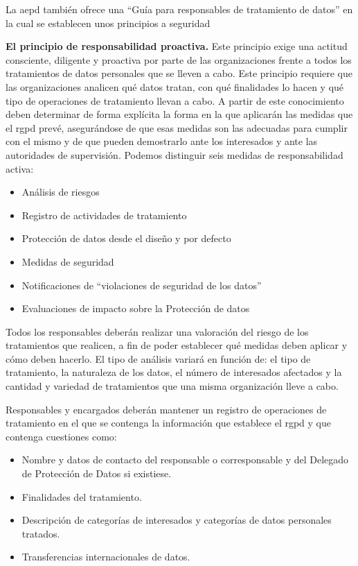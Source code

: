 La \gls{aepd} también ofrece una ``Guía para responsables de tratamiento de datos'' en la cual se establecen unos principios a seguridad

\textbf{El principio de responsabilidad proactiva.} Este principio exige una actitud consciente, diligente y proactiva por parte de las organizaciones frente a todos los tratamientos de datos personales que se lleven a cabo. Este principio requiere que las organizaciones analicen qué datos tratan, con qué finalidades lo hacen y qué tipo de operaciones de tratamiento llevan a cabo. A partir de este conocimiento deben determinar de forma explícita la forma en la que aplicarán las medidas que el \gls{rgpd} prevé, asegurándose de que esas medidas son las adecuadas para cumplir con el mismo y de que pueden demostrarlo ante los interesados y ante las autoridades de supervisión.
Podemos distinguir seis medidas de responsabilidad activa:
\begin{itemize}
    \item Análisis de riesgos
    \item Registro de actividades de tratamiento
    \item Protección de datos desde el diseño y por defecto
    \item Medidas de seguridad
    \item Notificaciones de ``violaciones de seguridad de los datos''
    \item Evaluaciones de impacto sobre la Protección de datos
\end{itemize}

Todos los responsables deberán realizar una valoración del riesgo de los tratamientos que realicen, a fin de poder establecer qué medidas deben aplicar y cómo deben hacerlo. El tipo de análisis variará en función de: el tipo de tratamiento, la naturaleza de los datos, el número de interesados afectados y la cantidad y variedad de tratamientos que una misma organización lleve a cabo.

Responsables y encargados deberán mantener un registro de operaciones de tratamiento en el que se contenga la información que establece el \gls{rgpd} y que contenga cuestiones como:
\begin{itemize}
    \item Nombre y datos de contacto del responsable o corresponsable y del Delegado de Protección de Datos si existiese.
    \item Finalidades del tratamiento.
    \item Descripción de categorías de interesados y categorías de datos personales tratados.
    \item Transferencias internacionales de datos.
\end{itemize}

